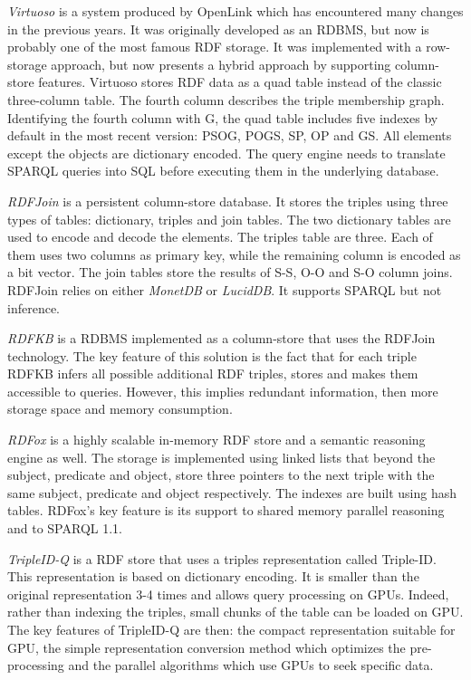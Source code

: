 \documentclass[10pt, a4paper]{report}
\begin{document}
\textit{Virtuoso}\cite{virtuoso} is a system produced by OpenLink which has encountered many changes in the previous years. It was originally developed as an RDBMS, but now is probably one of the most famous RDF storage. It was implemented with a row-storage approach, but now presents a hybrid approach by supporting column-store features. Virtuoso stores RDF data as a quad table instead of the classic three-column table. The fourth column describes the triple membership graph. Identifying the fourth column with G, the quad table includes five indexes by default in the most recent version: PSOG, POGS, SP, OP and GS. All elements except the objects are dictionary encoded. The query engine needs to translate SPARQL queries into SQL before executing them in the underlying database.

\textit{RDFJoin}\cite{rdfjoin} is a persistent column-store database. It stores the triples using three types of tables: dictionary, triples and join tables. The two dictionary tables are used to encode and decode the elements. The triples table are three. Each of them uses two columns as primary key, while the remaining column is encoded as a bit vector. The join tables store the results of S-S, O-O and S-O column joins. RDFJoin relies on either \textit{MonetDB} or \textit{LucidDB}. It supports SPARQL but not inference.

\textit{RDFKB}\cite{rdfkb} is a RDBMS implemented as a column-store that uses the RDFJoin technology. The key feature of this solution is the fact that for each triple RDFKB infers all possible additional RDF triples, stores and makes them accessible to queries. However, this implies redundant information, then more storage space and memory consumption.

\textit{RDFox}\cite{rdfox} is a highly scalable in-memory RDF store and a semantic reasoning engine as well. The storage is implemented using linked lists that beyond the subject, predicate and object, store three pointers to the next triple with the same subject, predicate and object respectively. The indexes are built using hash tables. RDFox's key feature is its support to shared memory parallel reasoning and to SPARQL 1.1.

\textit{TripleID-Q}\cite{tripleidq} is a RDF store that uses a triples representation called Triple-ID. This representation is based on dictionary encoding. It is smaller than the original representation 3-4 times and allows query processing on GPUs. Indeed, rather than indexing the triples, small chunks of the table can be loaded on GPU. The key features of TripleID-Q are then: the compact representation suitable for GPU, the simple representation conversion method which optimizes the pre-processing and the parallel algorithms which use GPUs to seek specific data.
\end{document}
